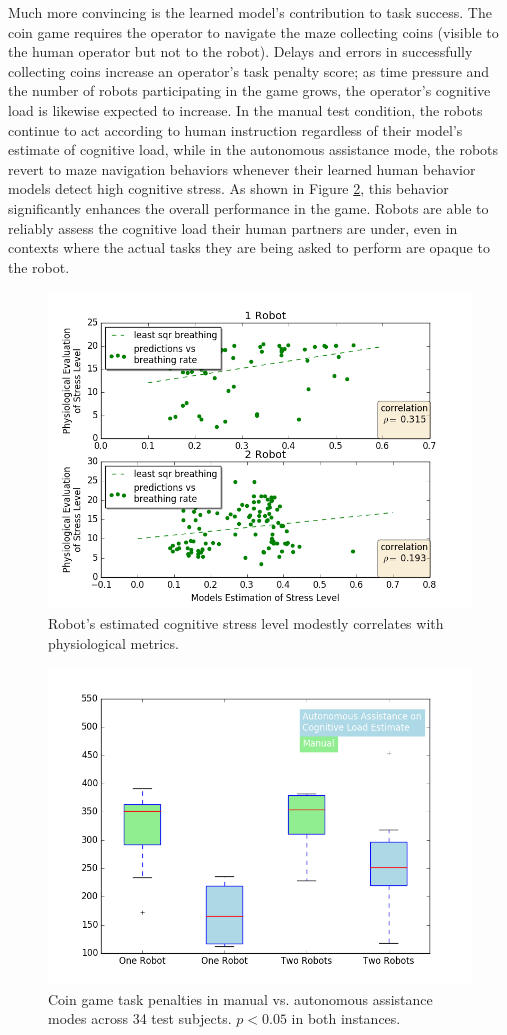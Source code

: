\documentclass{sig-alternate-05-2015}
\begin{document}
Much more convincing is the learned model's contribution to task
success. The coin game requires the operator to navigate the maze
collecting coins (visible to the human operator but not to the
robot). Delays and errors in successfully collecting coins increase an
operator's task penalty score; as time pressure and the number of
robots participating in the game grows, the operator's cognitive load
is likewise expected to increase. In the manual test condition, the
robots continue to act according to human instruction regardless of
their model's estimate of cognitive load, while in the autonomous
assistance mode, the robots revert to maze navigation behaviors
whenever their learned human behavior models detect high cognitive
stress. As shown in Figure \ref{fig:BoxWiskersTimeComp}, this behavior
significantly enhances the overall performance in the game. Robots are
able to reliably assess the cognitive load their human partners are
under, even in contexts where the actual tasks they are being asked to
perform are opaque to the robot.

\begin{figure}  
\centering
\includegraphics[width=.5\textwidth]{prediction_vs_b_p_2.png}
\caption{Robot's estimated cognitive stress level modestly correlates
  with physiological metrics.}
\label{fig:pred_phy}
\end{figure}

\begin{figure}
\centering
\includegraphics[width=.5\textwidth]{BoxWiskerTimesCompMaualVsAuto2.png}
\caption{Coin game task penalties in manual vs. autonomous assistance
  modes across 34 test subjects. $p < 0.05$ in both instances.}
\label{fig:BoxWiskersTimeComp}
\end{figure}
\end{document}
